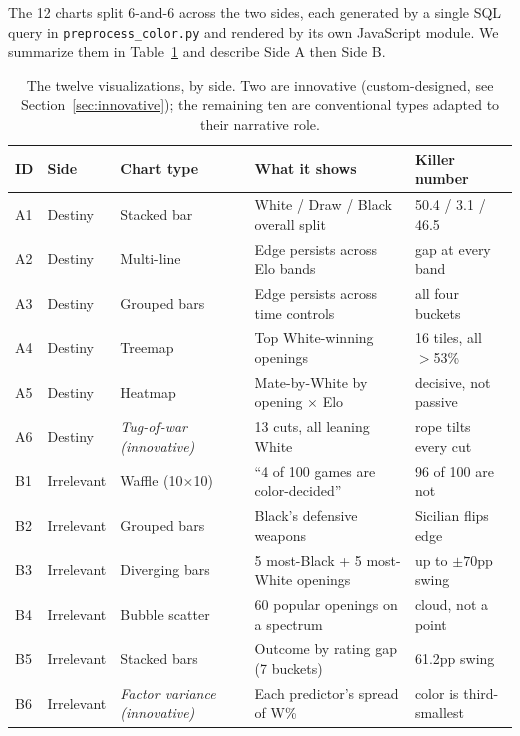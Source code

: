 \documentclass[sigconf,nonacm,natbib=false]{acmart}
\begin{document}
The 12 charts split 6-and-6 across the two sides, each generated by
a single SQL query in \texttt{preprocess\_color.py} and rendered by
its own JavaScript module. We summarize them in Table~\ref{tab:viz}
and describe Side A then Side B.

\begin{table}[t]
\centering
\small
\begin{tabular}{@{}lllll@{}}
\toprule
\textbf{ID} & \textbf{Side} & \textbf{Chart type} & \textbf{What it shows} & \textbf{Killer number} \\
\midrule
A1 & Destiny      & Stacked bar           & White / Draw / Black overall split  & 50.4 / 3.1 / 46.5 \\
A2 & Destiny      & Multi-line            & Edge persists across Elo bands      & gap at every band \\
A3 & Destiny      & Grouped bars          & Edge persists across time controls  & all four buckets \\
A4 & Destiny      & Treemap               & Top White-winning openings          & 16 tiles, all $>$53\% \\
A5 & Destiny      & Heatmap               & Mate-by-White by opening $\times$ Elo & decisive, not passive \\
A6 & Destiny      & \emph{Tug-of-war (innovative)} & 13 cuts, all leaning White & rope tilts every cut \\
\midrule
B1 & Irrelevant   & Waffle (10$\times$10) & ``4 of 100 games are color-decided'' & 96 of 100 are not \\
B2 & Irrelevant   & Grouped bars          & Black's defensive weapons           & Sicilian flips edge \\
B3 & Irrelevant   & Diverging bars        & 5 most-Black + 5 most-White openings & up to $\pm 70$pp swing \\
B4 & Irrelevant   & Bubble scatter        & 60 popular openings on a spectrum   & cloud, not a point \\
B5 & Irrelevant   & Stacked bars          & Outcome by rating gap (7 buckets)   & 61.2pp swing \\
B6 & Irrelevant   & \emph{Factor variance (innovative)} & Each predictor's spread of W\% & color is third-smallest \\
\bottomrule
\end{tabular}
\caption{The twelve visualizations, by side. Two are innovative
(custom-designed, see Section~\ref{sec:innovative}); the remaining
ten are conventional types adapted to their narrative role.}
\label{tab:viz}
\end{table}
\end{document}
